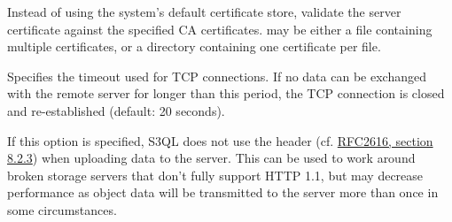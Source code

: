 \documentclass[letterpaper,10pt,english]{sphinxmanual}
\begin{document}

\begin{fulllineitems}
\label{backends:cmdoption-s3c_backend-arg-ssl-ca-path}
Instead of using the system's default certificate store, validate
the server certificate against the specified CA
certificates.  may be either a file containing
multiple certificates, or a directory containing one certificate
per file.

\end{fulllineitems}


\begin{fulllineitems}
\label{backends:cmdoption-s3c_backend-arg-tcp-timeout}
Specifies the timeout used for TCP connections. If no data can be
exchanged with the remote server for longer than this period, the
TCP connection is closed and re-established (default: 20 seconds).

\end{fulllineitems}


\begin{fulllineitems}
\label{backends:cmdoption-s3c_backend-arg-disable-expect100}
If this option is specified, S3QL does not use the  header (cf. \href{http://tools.ietf.org/html/rfc2616\#section-8.2.3}{RFC2616, section 8.2.3}) when uploading
data to the server. This can be used to work around broken storage
servers that don't fully support HTTP 1.1, but may decrease
performance as object data will be transmitted to the server more
than once in some circumstances.

\end{fulllineitems}

\end{document}
